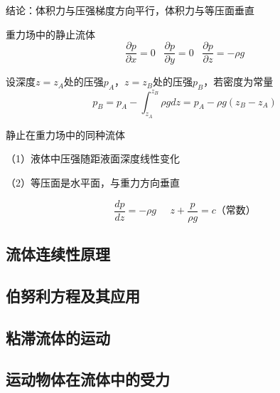 \documentclass[UTF8]{article}
\begin{document}
    结论：体积力与压强梯度方向平行，体积力与等压面垂直

    重力场中的静止流体\[\frac{\partial p}{\partial x} = 0\;\;\;\frac{\partial p}{\partial y} = 0\;\;\;\frac{\partial p}{\partial z} = -\rho g\]

    设深度$z = z_A$处的压强$p_A$，$z = z_B$处的压强$p_B$，若密度为常量
    \[p_B = p_A - \int_{z_A}^{z_B}\rho gdz = p_A - \rho g(z_B - z_A)\]

    静止在重力场中的同种流体

    \;\;（1）液体中压强随距液面深度线性变化

    \;\;（2）等压面是水平面，与重力方向垂直

    \[\frac{dp}{dz} = -\rho g\;\;\;\;\;z + \frac{p}{\rho g} = c\mbox{（常数）}\]
\subsection{流体连续性原理}
\subsection{伯努利方程及其应用}
\subsection{粘滞流体的运动}
\subsection{运动物体在流体中的受力}
\end{document}
